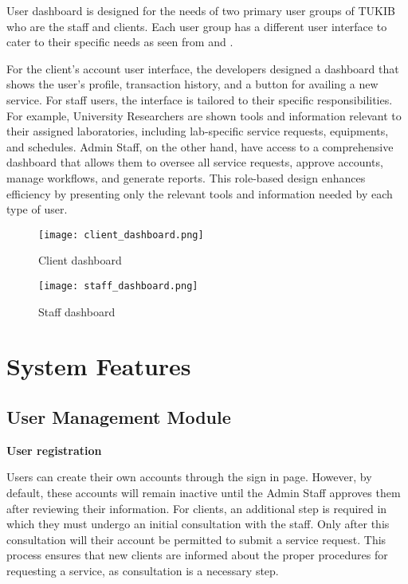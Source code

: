 User dashboard is designed for the needs of two primary user groups of TUKIB who are the staff and clients. Each user group has a different user interface to cater to their specific needs as seen from  and .

For the client’s account user interface, the developers designed a dashboard that shows the user’s profile, transaction history, and a button for availing a new service. For staff users, the interface is tailored to their specific responsibilities. For example, University Researchers are shown tools and information relevant to their assigned laboratories, including lab-specific service requests, equipments, and schedules. Admin Staff, on the other hand, have access to a comprehensive dashboard that allows them to oversee all service requests, approve accounts, manage workflows, and generate reports. This role-based design enhances efficiency by presenting only the relevant tools and information needed by each type of user.

\begin{figure}[h]
	\centering 
	\texttt{[image: client\_dashboard.png]}
	\caption{Client dashboard}
	\label{fig:client_dashboard}
\end{figure}

\begin{figure}[h]
	\centering 
	\texttt{[image: staff\_dashboard.png]}
	\caption{Staff dashboard}
	\label{fig:staff_dashboard}
\end{figure}

\newpage

\section{System Features}

\subsection{User Management Module}

\textbf{User registration}

Users can create their own accounts through the sign in page. However, by default, these accounts will remain inactive until the Admin Staff approves them after reviewing their information. For clients, an additional step is required in which they must undergo an initial consultation with the staff. Only after this consultation will their account be permitted to submit a service request. This process ensures that new clients are informed about the proper procedures for requesting a service, as consultation is a necessary step.


